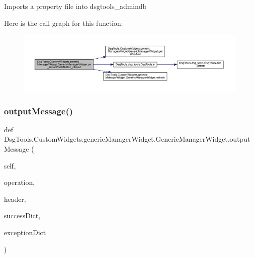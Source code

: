 \begin{DoxyVerb}Imports a property file into dsgtools_admindb
\end{DoxyVerb}
 Here is the call graph for this function\+:
\nopagebreak
\begin{figure}[H]
\begin{center}
\leavevmode
\includegraphics[width=350pt]{class_dsg_tools_1_1_custom_widgets_1_1generic_manager_widget_1_1_generic_manager_widget_ada869fc121216cd91360d906817cd89d_cgraph}
\end{center}
\end{figure}
\mbox{\label{class_dsg_tools_1_1_custom_widgets_1_1generic_manager_widget_1_1_generic_manager_widget_aef0d68dae266dd315aa07d964476108d}} 
\subsubsection{\texorpdfstring{output\+Message()}{outputMessage()}}
{\footnotesize\ttfamily def Dsg\+Tools.\+Custom\+Widgets.\+generic\+Manager\+Widget.\+Generic\+Manager\+Widget.\+output\+Message (\begin{DoxyParamCaption}\item[{}]{self,  }\item[{}]{operation,  }\item[{}]{header,  }\item[{}]{success\+Dict,  }\item[{}]{exception\+Dict }\end{DoxyParamCaption})}

